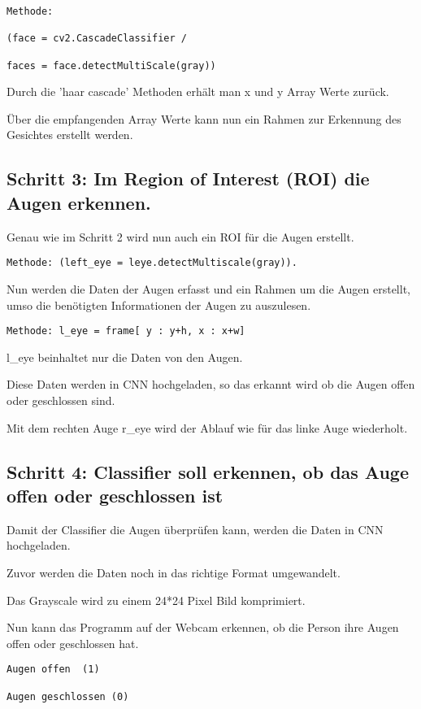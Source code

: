 \begin{lstlisting}
Methode: 

(face = cv2.CascadeClassifier / 

faces = face.detectMultiScale(gray))
\end{lstlisting}

Durch die 'haar cascade' Methoden erhält man x und y Array Werte zurück. 

Über die empfangenden Array Werte kann nun ein Rahmen zur Erkennung des Gesichtes erstellt werden. 


\subsection{Schritt 3: Im Region of Interest (ROI) die Augen erkennen.}

Genau wie im Schritt 2 wird nun auch ein ROI für die Augen erstellt. 

\begin{lstlisting}
Methode: (left_eye = leye.detectMultiscale(gray)).
\end{lstlisting}

Nun werden die Daten der Augen erfasst und ein Rahmen um die Augen erstellt, 
umso die benötigten Informationen der Augen zu auszulesen.

\begin{lstlisting}
Methode: l_eye = frame[ y : y+h, x : x+w] 
\end{lstlisting}
 
l\_eye beinhaltet nur die Daten von den Augen.

Diese Daten werden in CNN hochgeladen, so das erkannt wird ob die Augen offen oder geschlossen sind. 

Mit dem rechten Auge r\_eye wird der Ablauf wie für das linke Auge wiederholt.

\subsection{Schritt 4: Classifier soll erkennen, ob das Auge offen oder geschlossen ist}

Damit der Classifier die Augen überprüfen kann, werden die Daten in CNN hochgeladen. 

Zuvor werden die Daten noch in das richtige Format umgewandelt. 

Das Grayscale wird zu einem 24*24 Pixel Bild komprimiert. 

Nun kann das Programm auf der Webcam erkennen, ob die Person ihre Augen offen oder geschlossen hat.
\begin{lstlisting}
Augen offen  (1)

Augen geschlossen (0)
\end{lstlisting}

